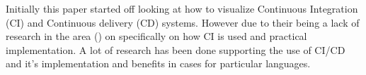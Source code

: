 \documentclass[twoside,12pt,titlepage,a4paper]{article}
\begin{document}
Initially this paper started off looking at how to visualize Continuous Integration (CI) and Continuous delivery (CD) systems. However due to their being a lack of research in the area () on specifically on how CI is used and practical implementation. A lot of research has been done supporting the use of CI/CD and it's implementation and benefits in cases for particular languages.



\end{document}
